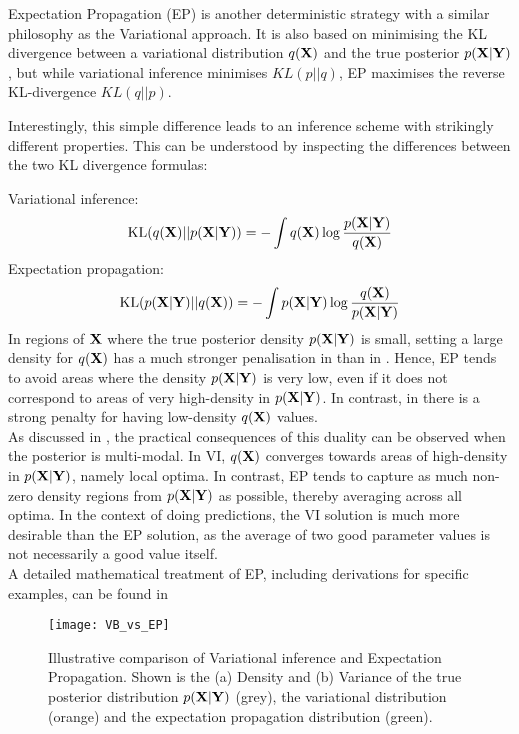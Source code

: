 Expectation Propagation (EP) is another deterministic strategy with a similar philosophy as the Variational approach. It is also based on minimising the KL divergence between a variational distribution $q({\bf X})$ and the true posterior $p({\bf X}|{\bf Y})$, but while variational inference minimises $KL(p||q)$, EP maximises the reverse KL-divergence $KL(q||p)$.

Interestingly, this simple difference leads to an inference scheme with strikingly different properties. This can be understood by inspecting the differences between the two KL divergence formulas:

Variational inference:
\begin{equation} \label{eq:kl_vb}
	{\rm KL}(q({\bf X})||p({\bf X}|{\bf Y})) = - \int q({\bf X}) \log \frac{p({\bf X}|{\bf Y})}{q({\bf X})}
\end{equation}
Expectation propagation:
\begin{equation} \label{eq:kl_ep}
	{\rm KL}(p({\bf X}|{\bf Y})||q({\bf X})) = - \int p({\bf X}|{\bf Y}) \log \frac{q({\bf X})}{p({\bf X}|{\bf Y})}
\end{equation}
In regions of ${\bf X}$ where the true posterior density $p({\bf X}|{\bf Y})$ is small, setting a large density for $q({\bf X})$ has a much stronger penalisation in  than in . Hence, EP tends to avoid areas where the density $p({\bf X}|{\bf Y})$ is very low, even if it does not correspond to areas of very high-density in $p({\bf X}|{\bf Y})$. In contrast, in  there is a strong penalty for having low-density $q({\bf X})$ values.\\
As discussed in \cite{Bishop2006}, the practical consequences of this duality can be observed when the posterior is multi-modal. In VI, $q({\bf X})$ converges towards areas of high-density in $p({\bf X}|{\bf Y})$, namely local optima. In contrast, EP tends to capture as much non-zero density regions from $p({\bf X}|{\bf Y})$ as possible, thereby averaging across all optima. In the context of doing predictions, the VI solution is much more desirable than the EP solution, as the average of two good parameter values is not necessarily a good value itself.\\
A detailed mathematical treatment of EP, including derivations for specific examples, can be found in \cite{Bishop2006,Murphy,Minka2001}

\begin{figure}[H]
	\centering
	\texttt{[image: VB\_vs\_EP]}
	\caption{Illustrative comparison of Variational inference and Expectation Propagation. Shown is the (a) Density and (b) Variance of the true posterior distribution $p({\bf X}|{\bf Y})$ (grey), the variational distribution (orange) and the expectation propagation distribution (green).}
	\label{}
\end{figure}

